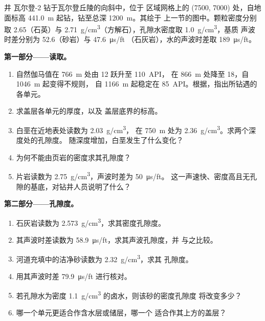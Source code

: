 \begin{problem}
\label{pb:b3:facies-models:1}
井 瓦尔登-2 钻于瓦尔登丘陵的向斜中，位于
区域网格上的 (7500, 7000) 处，自地面标高
\qty{441.0}{m} 起钻，钻至总深 \qty{1200}{m}。其绘于
上一节的图中。颗粒密度分别取 2.65（石英）与
\qty{2.71}{g/cm^3}（方解石），孔隙水密度取 \qty{1.0}{g/cm^3}，基质
声波时差分别为 52.6（砂岩）与 \qty{47.6}{\micro\second/ft}
（石灰岩），水的声波时差取 \qty{189}{\micro\second/ft}。

\medskip\noindent\textbf{第一部分——读取。}
\begin{enumerate}
\item 自然伽马值在 \qty{766}{m} 处由 12 跃升至 \qty{110}{API}，
  在 \qty{866}{m} 处降至 18，自 \qty{1046}{m} 起变得不规则，
  自 \qty{1166}{m} 起稳定在 \qty{85}{API}。根据，指出所钻遇的各单元。
\item 求盖层各单元的厚度，以及
  盖层底界的标高。
\item 白垩在近地表处读数为 \qty{2.03}{g/cm^3}，
  在 \qty{750}{m} 处为 \qty{2.36}{g/cm^3}。求两个深度处的孔隙度。
  随深度增加，白垩发生了什么变化？
\item 为何不能由页岩的密度求其孔隙度？
\item 片岩读数为 \qty{2.75}{g/cm^3}，声波时差为 \qty{50}{\micro\second/ft}。
  这一声速快、密度高且无孔隙的基底，对钻井人员说明了什么？
\end{enumerate}

\medskip\noindent\textbf{第二部分——孔隙度。}
\begin{enumerate}[resume]
\item 石灰岩读数为 \qty{2.573}{g/cm^3}，求其密度孔隙度。
\item 其声波时差读数为 \qty{58.9}{\micro\second/ft}，求其声波孔隙度，并
  与之比较。
\item 河道充填中的洁净砂读数为 \qty{2.32}{g/cm^3}，求其
  孔隙度。
\item 用其声波时差 \qty{79.9}{\micro\second/ft} 进行核对。
\item 若孔隙水为密度 \qty{1.1}{g/cm^3} 的卤水，则该砂的密度孔隙度
  将改变多少？
\item 哪一个单元更适合作含水层或储层，哪一个
  适合作其上方的盖层？
\end{enumerate}


\end{problem}
